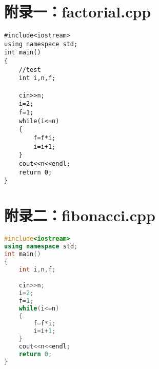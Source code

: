 \newpage
\appendix %

\section{附录一：factorial.cpp}
\begin{lstlisting}[language={[x86masm]Assembler}]
#include<iostream>
using namespace std;
int main()
{
	//test
	int i,n,f;

	cin>>n;
	i=2;
	f=1;
	while(i<=n)
	{
		f=f*i;
		i=i+1;
	}
	cout<<n<<endl;
	return 0;
}
\end{lstlisting}
\section{附录二：fibonacci.cpp}



\begin{lstlisting}[language={c++}]
#include<iostream>
using namespace std;
int main()
{
	int i,n,f;

	cin>>n;
	i=2;
	f=1;
	while(i<=n)
	{
		f=f*i;
		i=i+1;
	}
	cout<<n<<endl;
	return 0;
}

\end{lstlisting}
\clearpage






